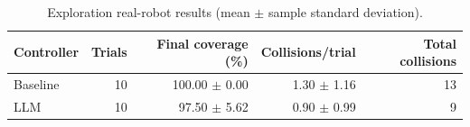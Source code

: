 \begin{table}[htbp]
\centering
\caption{Exploration real-robot results (mean $\pm$ sample standard deviation).}
\label{tab:real-exploration}
\begin{tabular}{lrrrr}
\hline
Controller & Trials & Final coverage (\%) & Collisions/trial & Total collisions \\
\hline
Baseline & 10 & 100.00 $\pm$ 0.00 & 1.30 $\pm$ 1.16 & 13 \\
LLM & 10 & 97.50 $\pm$ 5.62 & 0.90 $\pm$ 0.99 & 9 \\
\hline
\end{tabular}
\end{table}
